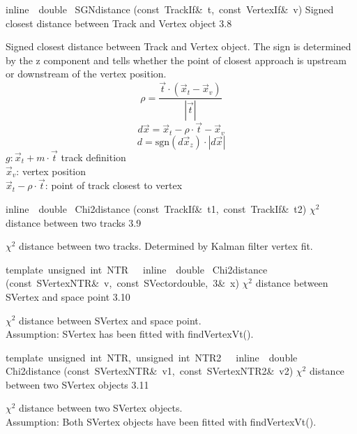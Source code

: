 \documentclass{article}
\begin{document}
\begin{cxxentry}
\begin{cxxfunction}
{inline\ \ double\ }
        {SGNdistance}
        {(const\ TrackIf\&\ t,\ const\ VertexIf\&\ v)}
        {Signed closest distance between Track and Vertex object}
        {3.8}
\begin{cxxdoc}
Signed closest distance between Track and Vertex object.
The sign is determined by the z component and tells whether the point
of closest approach is upstream or downstream of the vertex position.
\begin{displaymath}
\rho = \frac{\vec{t}\cdot(\vec{x}_t-\vec{x}_v)}{|\vec{t}|}
\end{displaymath}
\begin{displaymath}
d\vec{x} = \vec{x}_t - \rho\cdot\vec{t} - \vec{x}_v
\end{displaymath}
\begin{displaymath}
d = \textrm{sgn}(d\vec{x}_z)\cdot|d\vec{x}|
\end{displaymath}
$g: \vec{x}_t + m\cdot\vec{t}$ track definition\\
$\vec{x}_v$: vertex position\\
$\vec{x}_t - \rho\cdot\vec{t}$: point of track closest to vertex
\end{cxxdoc}
\end{cxxfunction}
\begin{cxxfunction}
{inline\ \ double\ }
        {Chi2distance}
        {(const\ TrackIf\&\ t1,\ const\ TrackIf\&\ t2)}
        {$\chi^2$ distance between two tracks}
        {3.9}
\begin{cxxdoc}
$\chi^2$ distance between two tracks.
Determined by Kalman filter vertex fit.
\end{cxxdoc}
\end{cxxfunction}
\begin{cxxfunction}
{template\ \<unsigned\ int\ NTR\>\ \ \ inline\ \ double\ }
        {Chi2distance}
        {(const\ SVertex\<NTR\>\&\ v,\ const\ SVector\<double,\ 3\>\&\ x)}
        {$\chi^2$ distance between SVertex and space point}
        {3.10}
\begin{cxxdoc}
$\chi^2$ distance between SVertex and space point.\\
Assumption: SVertex has been fitted with findVertexVt().
\end{cxxdoc}
\end{cxxfunction}
\begin{cxxfunction}
{template\ \<unsigned\ int\ NTR,\ unsigned\ int\ NTR2\>\ \ \ inline\ \ double\ }
        {Chi2distance}
        {(const\ SVertex\<NTR\>\&\ v1,\ const\ SVertex\<NTR2\>\&\ v2)}
        {$\chi^2$ distance between two SVertex objects}
        {3.11}
\begin{cxxdoc}
$\chi^2$ distance between two SVertex objects.\\
Assumption: Both SVertex objects have been fitted with findVertexVt().
\end{cxxdoc}
\end{cxxfunction}
\end{cxxentry}
\end{document}
